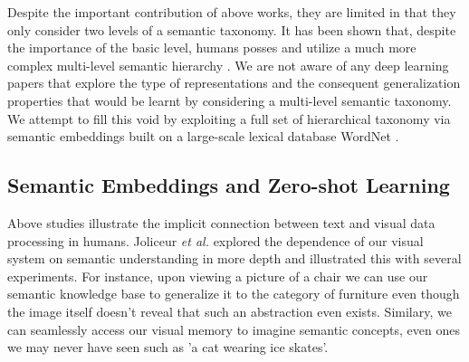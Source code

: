 \documentclass[12pt]{report}
\begin{document}
Despite the important contribution of above works, they are limited in that they only consider two levels of a semantic taxonomy. It has been shown that, despite the importance of the basic level, humans posses and utilize a much more complex multi-level semantic hierarchy \cite{Joliceur1984}. We are not aware of any deep learning papers that explore the type of representations and the consequent generalization properties that would be learnt by considering a multi-level semantic taxonomy. We attempt to fill this void by exploiting a full set of hierarchical taxonomy via semantic embeddings built on a large-scale lexical database WordNet \cite{Miller1995}.

\subsection{Semantic Embeddings and Zero-shot Learning} \label{sec:semlit}
Above studies illustrate the implicit connection between text and visual data processing in humans. Joliceur \textit{et al.} \cite{Joliceur1984} explored the dependence of our visual system on semantic understanding in more depth and illustrated this with several experiments. For instance, upon viewing a picture of a chair we can use our semantic knowledge base to generalize it to the category of furniture even though the image itself doesn't reveal that such an abstraction even exists. Similary, we can seamlessly access our visual memory to imagine semantic concepts, even ones we may never have seen such as 'a cat wearing ice skates'.
\end{document}
